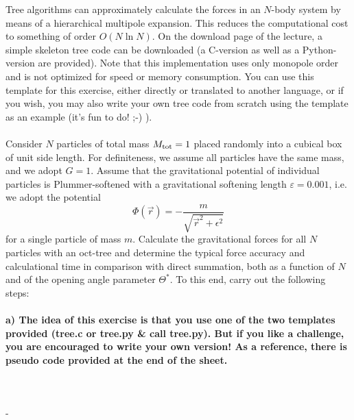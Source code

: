 Tree algorithms can approximately calculate the forces in an 
$N$-body system by means of a hierarchical multipole expansion. 
This reduces the computational cost to something of order 
$O(N \ln N)$. On the download page of the lecture, a simple 
skeleton tree code can be downloaded (a C-version as well as a 
Python-version are provided). Note that this implementation uses 
only monopole order and is not optimized for speed or memory 
consumption. You can use this template for this exercise, 
either directly or translated to another language, or if you 
wish, you may also write your own tree code from scratch using 
the template as an example (it’s fun to do! ;-) ). \\
\\
Consider $N$ particles of total mass $M_{\textnormal{tot}}=1$ 
placed randomly into a cubical box of unit side length. For 
definiteness, we assume all particles have the same mass, and 
we adopt $G=1$. Assume that the gravitational potential of 
individual particles is Plummer-softened with a gravitational 
softening length $\varepsilon=0.001$, 
i.e. we adopt the potential
\begin{equation}
    \Phi(\vec r)=-\frac{m}{\sqrt{\vec r^2+\epsilon^2}}
\end{equation}
for a single particle of mass $m$.
Calculate the gravitational forces for all $N$ particles with an 
oct-tree and determine the typical force accuracy and 
calculational time in comparison with direct summation, both as 
a function of $N$ and of the opening angle parameter $\Theta^*$. 
To this end, carry out the following steps:


\paragraph{a) The idea of this exercise is that you use one of 
    the two templates provided (tree.c or tree.py \& call 
    tree.py). But if you like a challenge, you are encouraged 
    to write your own version! As a reference, there is pseudo 
    code provided at the end of the sheet.
} \ \\
    \\
    -


\newpage
